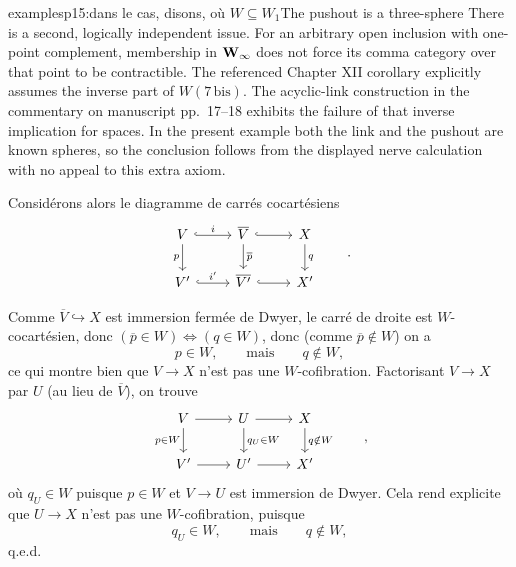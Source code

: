 \begin{dcomment}{examples}{p15:dans le cas, disons, où $W \subseteq W_1$}{The pushout is a three-sphere}
There is a second, logically independent issue. For an arbitrary open inclusion with one-point complement, membership in $\mathbf{W}_{\infty}$ does not force its comma category over that point to be contractible. The referenced Chapter XII corollary explicitly assumes the inverse part of $W(7\,\mathrm{bis})$. The acyclic-link construction in the commentary on manuscript pp.~17--18 exhibits the failure of that inverse implication for spaces. In the present example both the link and the pushout are known spheres, so the conclusion follows from the displayed nerve calculation with no appeal to this extra axiom.
\end{dcomment}


Considérons alors le diagramme de carrés cocartésiens
\[
\begin{tikzcd}
V \arrow[r, hook, "i"] \arrow[d, "p"'] & \overline{V} \arrow[r, hook] \arrow[d, "\overline{p}"] & X \arrow[d, "q"] \\
V' \arrow[r, hook, "i'"] & \overline{V'} \arrow[r, hook] & X'
\end{tikzcd}
\qquad .
\]

Comme $\overline{V} \hookrightarrow X$ est immersion fermée de Dwyer, le carré de droite est $W$-cocartésien, donc $(\overline{p} \in W) \iff (q \in W)$, donc (comme $\overline{p} \notin W$) on a
\[ p \in W, \qquad \text{mais} \qquad q \notin W, \]
ce qui montre bien que $V \longrightarrow X$ n'est pas une $W$-cofibration. Factorisant $V \longrightarrow X$ par $U$ (au lieu de $\overline{V}$), on trouve
\[
\begin{tikzcd}
V \arrow[r] \arrow[d, "p\in W"'] & U \arrow[r] \arrow[d, "q_U\in W"] & X \arrow[d, "q\notin W"] \\
V' \arrow[r] & U' \arrow[r] & X'
\end{tikzcd}
\qquad ,
\]
où $q_U \in W$ puisque $p \in W$ et $V \longrightarrow U$ est immersion de Dwyer. Cela rend explicite que $U \longrightarrow X$ n'est pas une $W$-cofibration, puisque
\[ q_U \in W, \qquad \text{mais} \qquad q \notin W, \]
\hfill q.e.d.

